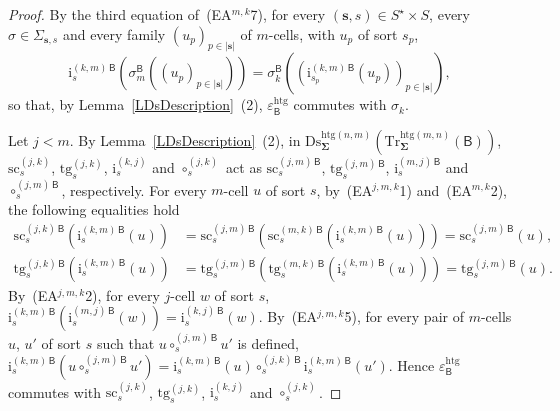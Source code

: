 \documentclass[a4paper, reqno]{amsbook}
\newcommand{\bb}[1]{\ensuremath{\lvert #1 \rvert}}
\newcommand{\sig}[1]{\mathbf{#1}}             %
\newcommand{\calg}[1]{\boldsymbol{\mathsf{#1}}} %
\newcommand{\htg}{\mathrm{htg}}                %
\newcommand{\src}{\mathrm{sc}}
\newcommand{\tgt}{\mathrm{tg}}
\newcommand{\Ds}{\mathrm{Ds}}
\newcommand{\Tr}{\mathrm{Tr}}
\theoremstyle{plain}
\theoremstyle{definition}
\begin{document}
\begin{proof}
By the third equation of~(EA$^{m,k}$7), for every $(\mathbf{s},s)\in S^{\star}\times S$, every $\sigma\in\Sigma_{\mathbf{s},s}$ and every family $(u_{p})_{p\in\bb{\mathbf{s}}}$ of $m$-cells, with $u_{p}$ of sort $s_{p}$,
$$
\mathrm{i}^{(k,m)\,\calg{B}}_{s}\left(\sigma^{\calg{B}}_{m}((u_{p})_{p\in\bb{\mathbf{s}}})\right)=\sigma^{\calg{B}}_{k}\left(\left(\mathrm{i}^{(k,m)\,\calg{B}}_{s_{p}}(u_{p})\right)_{p\in\bb{\mathbf{s}}}\right),
$$
so that, by Lemma~\ref{LDsDescription}~(2), $\varepsilon^{\htg}_{\calg{B}}$ commutes with $\sigma_{k}$.

Let $j<m$.
By Lemma~\ref{LDsDescription}~(2), in $\Ds^{\htg(n,m)}_{\sig{\Sigma}}(\Tr^{\htg(m,n)}_{\sig{\Sigma}}(\calg{B}))$, $\src^{(j,k)}_{s}$, $\tgt^{(j,k)}_{s}$, $\mathrm{i}^{(k,j)}_{s}$ and $\circ^{(j,k)}_{s}$ act as $\src^{(j,m)\,\calg{B}}_{s}$, $\tgt^{(j,m)\,\calg{B}}_{s}$, $\mathrm{i}^{(m,j)\,\calg{B}}_{s}$ and $\circ^{(j,m)\,\calg{B}}_{s}$, respectively.
For every $m$-cell $u$ of sort $s$, by~(EA$^{j,m,k}$1) and~(EA$^{m,k}$2), the following equalities hold
\begin{align*}
\src^{(j,k)\,\calg{B}}_{s}\left(\mathrm{i}^{(k,m)\,\calg{B}}_{s}(u)\right)
&=\src^{(j,m)\,\calg{B}}_{s}\left(\src^{(m,k)\,\calg{B}}_{s}\left(\mathrm{i}^{(k,m)\,\calg{B}}_{s}(u)\right)\right)
=\src^{(j,m)\,\calg{B}}_{s}(u),\\
\tgt^{(j,k)\,\calg{B}}_{s}\left(\mathrm{i}^{(k,m)\,\calg{B}}_{s}(u)\right)
&=\tgt^{(j,m)\,\calg{B}}_{s}\left(\tgt^{(m,k)\,\calg{B}}_{s}\left(\mathrm{i}^{(k,m)\,\calg{B}}_{s}(u)\right)\right)
=\tgt^{(j,m)\,\calg{B}}_{s}(u).
\end{align*}
By~(EA$^{j,m,k}$2), for every $j$-cell $w$ of sort $s$, $\mathrm{i}^{(k,m)\,\calg{B}}_{s}(\mathrm{i}^{(m,j)\,\calg{B}}_{s}(w))=\mathrm{i}^{(k,j)\,\calg{B}}_{s}(w)$.
By~(EA$^{j,m,k}$5), for every pair of $m$-cells $u$, $u'$ of sort $s$ such that $u\circ^{(j,m)\,\calg{B}}_{s}u'$ is defined, $\mathrm{i}^{(k,m)\,\calg{B}}_{s}(u\circ^{(j,m)\,\calg{B}}_{s}u')=\mathrm{i}^{(k,m)\,\calg{B}}_{s}(u)\circ^{(j,k)\,\calg{B}}_{s}\mathrm{i}^{(k,m)\,\calg{B}}_{s}(u')$.
Hence $\varepsilon^{\htg}_{\calg{B}}$ commutes with $\src^{(j,k)}_{s}$, $\tgt^{(j,k)}_{s}$, $\mathrm{i}^{(k,j)}_{s}$ and $\circ^{(j,k)}_{s}$.


\end{proof}
\end{document}
